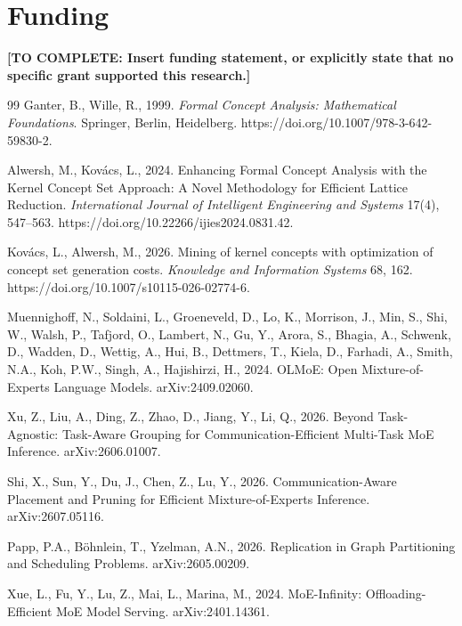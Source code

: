 \documentclass[a4paper,preprint,review,12pt,authoryear]{elsarticle}
\newcommand{\todo}[1]{\textcolor{red!75!black}{\textbf{[TO COMPLETE: #1]}}}
\begin{document}
\section*{Funding}
\todo{Insert funding statement, or explicitly state that no specific grant supported this research.}

\begin{thebibliography}{99}
Ganter, B., Wille, R., 1999. \textit{Formal Concept Analysis: Mathematical Foundations}. Springer, Berlin, Heidelberg. https://doi.org/10.1007/978-3-642-59830-2.

Alwersh, M., Kov\'acs, L., 2024. Enhancing Formal Concept Analysis with the Kernel Concept Set Approach: A Novel Methodology for Efficient Lattice Reduction. \textit{International Journal of Intelligent Engineering and Systems} 17(4), 547--563. https://doi.org/10.22266/ijies2024.0831.42.

Kov\'acs, L., Alwersh, M., 2026. Mining of kernel concepts with optimization of concept set generation costs. \textit{Knowledge and Information Systems} 68, 162. https://doi.org/10.1007/s10115-026-02774-6.

Muennighoff, N., Soldaini, L., Groeneveld, D., Lo, K., Morrison, J., Min, S., Shi, W., Walsh, P., Tafjord, O., Lambert, N., Gu, Y., Arora, S., Bhagia, A., Schwenk, D., Wadden, D., Wettig, A., Hui, B., Dettmers, T., Kiela, D., Farhadi, A., Smith, N.A., Koh, P.W., Singh, A., Hajishirzi, H., 2024. OLMoE: Open Mixture-of-Experts Language Models. arXiv:2409.02060.

Xu, Z., Liu, A., Ding, Z., Zhao, D., Jiang, Y., Li, Q., 2026. Beyond Task-Agnostic: Task-Aware Grouping for Communication-Efficient Multi-Task MoE Inference. arXiv:2606.01007.

Shi, X., Sun, Y., Du, J., Chen, Z., Lu, Y., 2026. Communication-Aware Placement and Pruning for Efficient Mixture-of-Experts Inference. arXiv:2607.05116.

Papp, P.A., B\"ohnlein, T., Yzelman, A.N., 2026. Replication in Graph Partitioning and Scheduling Problems. arXiv:2605.00209.

Xue, L., Fu, Y., Lu, Z., Mai, L., Marina, M., 2024. MoE-Infinity: Offloading-Efficient MoE Model Serving. arXiv:2401.14361.


\end{thebibliography}
\end{document}
